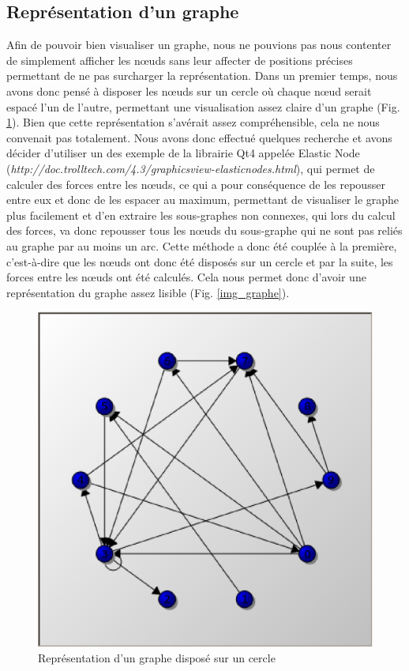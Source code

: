 \documentclass[11pt,a4paper]{article}
\begin{document}
		\subsection{Représentation d'un graphe}
			Afin de pouvoir bien visualiser un graphe, nous ne pouvions pas nous contenter de simplement afficher les n\oe uds sans leur affecter de positions précises permettant de ne pas surcharger la représentation. Dans un premier temps, nous avons donc pensé à disposer les n\oe uds sur un cercle où chaque n\oe ud serait espacé l'un de l'autre, permettant une visualisation assez claire d'un graphe (Fig. \ref{img_graphe_circle}). Bien que cette représentation s'avérait assez compréhensible, cela ne nous convenait pas totalement. Nous avons donc effectué quelques recherche et avons décider d'utiliser un des exemple de la librairie Qt4 appelée Elastic Node (\textit{http://doc.trolltech.com/4.3/graphicsview-elasticnodes.html}), qui permet de calculer des forces entre les n\oe uds, ce qui a pour conséquence de les repousser entre eux et donc de les espacer au maximum, permettant de visualiser le graphe plus facilement et d'en extraire les sous-graphes non connexes, qui lors du calcul des forces, va donc repousser tous les n\oe uds du sous-graphe qui ne sont pas reliés au graphe par au moins un arc. Cette méthode a donc été couplée à la première, c'est-à-dire que les n\oe uds ont donc été disposés sur un cercle et par la suite, les forces entre les n\oe uds ont été calculés. Cela nous permet donc d'avoir une représentation du graphe assez lisible (Fig. \ref{img_graphe}).
			\begin{figure}[htbp]
				\begin{center}
					\includegraphics[scale=0.4]{graph_circle.eps}
				\end{center}
				\caption{Représentation d'un graphe disposé sur un cercle}
				\label{img_graphe_circle}
			\end{figure}
			
\end{document}
